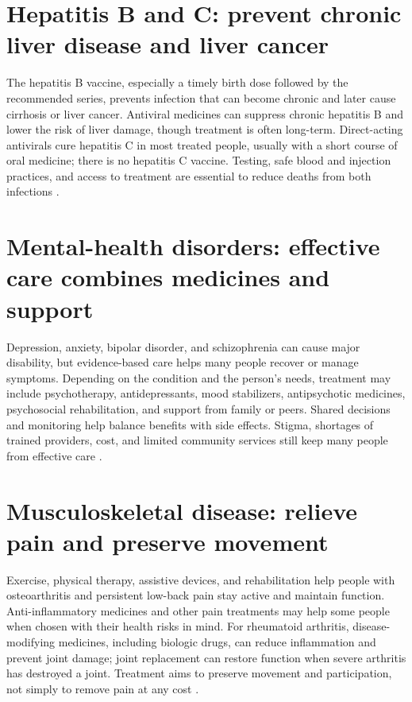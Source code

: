 \documentclass[12pt,oneside]{book}
\begin{document}
\section{Hepatitis B and C: prevent chronic liver disease and liver cancer}
The hepatitis B vaccine, especially a timely birth dose followed by the
recommended series, prevents infection that can become chronic and later
cause cirrhosis or liver cancer. Antiviral medicines can suppress chronic
hepatitis B and lower the risk of liver damage, though treatment is often
long-term. Direct-acting antivirals cure hepatitis C in most treated people,
usually with a short course of oral medicine; there is no hepatitis C
vaccine. Testing, safe blood and injection practices, and access to treatment
are essential to reduce deaths from both infections
\cite{whoHepB2026,whoHepC2026}.

\section{Mental-health disorders: effective care combines medicines and support}
Depression, anxiety, bipolar disorder, and schizophrenia can cause major
disability, but evidence-based care helps many people recover or manage
symptoms. Depending on the condition and the person's needs, treatment may
include psychotherapy, antidepressants, mood stabilizers, antipsychotic
medicines, psychosocial rehabilitation, and support from family or peers.
Shared decisions and monitoring help balance benefits with side effects.
Stigma, shortages of trained providers, cost, and limited community services
still keep many people from effective care \cite{whoMental2026}.

\section{Musculoskeletal disease: relieve pain and preserve movement}
Exercise, physical therapy, assistive devices, and rehabilitation help people
with osteoarthritis and persistent low-back pain stay active and maintain
function. Anti-inflammatory medicines and other pain treatments may help
some people when chosen with their health risks in mind. For rheumatoid
arthritis, disease-modifying medicines, including biologic drugs, can reduce
inflammation and prevent joint damage; joint replacement can restore function
when severe arthritis has destroyed a joint. Treatment aims to preserve
movement and participation, not simply to remove pain at any cost
\cite{whoMusculoskeletal2022,whoRehabilitation2024,acrMethotrexate}.
\end{document}
